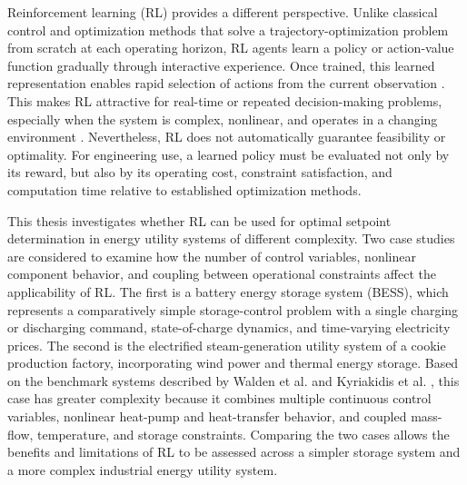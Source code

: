 \documentclass[12pt]{article}
\begin{document}
Reinforcement learning (RL) provides a different perspective. Unlike classical control and optimization methods that solve a trajectory-optimization problem from scratch at each operating horizon, RL agents learn a policy or action-value function gradually through interactive experience. Once trained, this learned representation enables rapid selection of actions from the current observation \cite{sutton2018reinforcement}. This makes RL attractive for real-time or repeated decision-making problems, especially when the system is complex, nonlinear, and operates in a changing environment \cite{pilling2025rl}. Nevertheless, RL does not automatically guarantee feasibility or optimality. For engineering use, a learned policy must be evaluated not only by its reward, but also by its operating cost, constraint satisfaction, and computation time relative to established optimization methods.

This thesis investigates whether RL can be used for optimal setpoint determination in energy utility systems of different complexity. Two case studies are considered to examine how the number of control variables, nonlinear component behavior, and coupling between operational constraints affect the applicability of RL. The first is a battery energy storage system (BESS), which represents a comparatively simple storage-control problem with a single charging or discharging command, state-of-charge dynamics, and time-varying electricity prices. The second is the electrified steam-generation utility system of a cookie production factory, incorporating wind power and thermal energy storage. Based on the benchmark systems described by Walden et al. and Kyriakidis et al. \cite{walden2023nonlinear,kyriakidis2024hybrid}, this case has greater complexity because it combines multiple continuous control variables, nonlinear heat-pump and heat-transfer behavior, and coupled mass-flow, temperature, and storage constraints. Comparing the two cases allows the benefits and limitations of RL to be assessed across a simpler storage system and a more complex industrial energy utility system.
\end{document}
